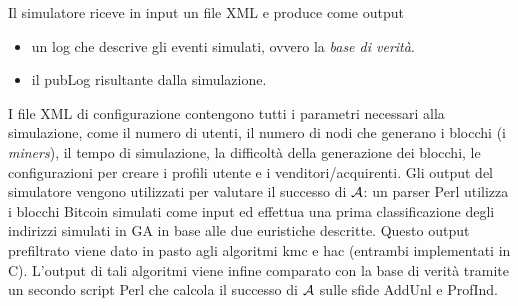 Il simulatore riceve in input un file XML e produce come output
\begin{itemize}
    \item un log che descrive gli eventi simulati, ovvero la \emph{base di verità}.
    \item il pubLog risultante dalla simulazione.
\end{itemize}
I file XML di configurazione contengono tutti i parametri necessari alla simulazione, come il numero di utenti, il numero di nodi che generano i blocchi (i \emph{miners}), il tempo di simulazione, la difficoltà della generazione dei blocchi, le configurazioni per creare i profili utente e i venditori/acquirenti.
Gli output del simulatore vengono utilizzati per valutare il successo di $\mathcal{A}$: un parser Perl utilizza i blocchi Bitcoin simulati come input ed effettua una prima classificazione degli indirizzi simulati in GA in base alle due euristiche descritte.
Questo output prefiltrato viene dato in pasto agli algoritmi \gls{kmc} e \gls{hac} (entrambi implementati in C).
L'output di tali algoritmi viene infine comparato con la base di verità tramite un secondo script Perl che calcola il successo di $\mathcal{A}$ sulle sfide AddUnl e ProfInd.

